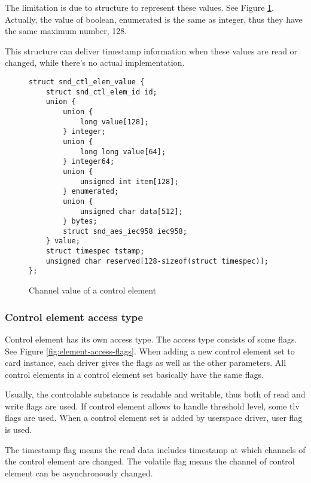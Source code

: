 \documentclass[onecolumn]{article}
\begin{document}
The limitation is due to structure to represent these values. See Figure \ref{fig:element-channel-value}. Actually, the value of boolean, enumerated is the same as integer, thus they have the same maximum number, 128.

This structure can deliver timestamp information when these values are read or changed, while there's no actual implementation.

\begin{figure}[htbp]
\small
\begin{verbatim}
struct snd_ctl_elem_value {
    struct snd_ctl_elem_id id;
    union {
        union {
            long value[128];
        } integer;
        union {
            long long value[64];
        } integer64;
        union {
            unsigned int item[128];
        } enumerated;
        union {
            unsigned char data[512];
        } bytes;
        struct snd_aes_iec958 iec958;
    } value;
    struct timespec tstamp;
    unsigned char reserved[128-sizeof(struct timespec)];
};
\end{verbatim}
\caption{{Channel value of a control element }}
\label{fig:element-channel-value}
\end{figure}


\subsubsection{Control element access type}

Control element has its own access type. The access type consists of some flags. See Figure \ref{fig:element-access-flags}. When adding a new control element set to card instance, each driver gives the flags as well as the other parameters. All control elements in a control element set basically have the same flags.

Usually, the controlable substance is readable and writable, thus both of read and write flags are used. If control element allows to handle threshold level, some tlv flags are used. When a control element set is added by userspace driver, user flag is used.

The timestamp flag means the read data includes timestamp at which channels of the control element are changed. The volatile flag means the channel of control element can be asynchronously changed.
\end{document}
